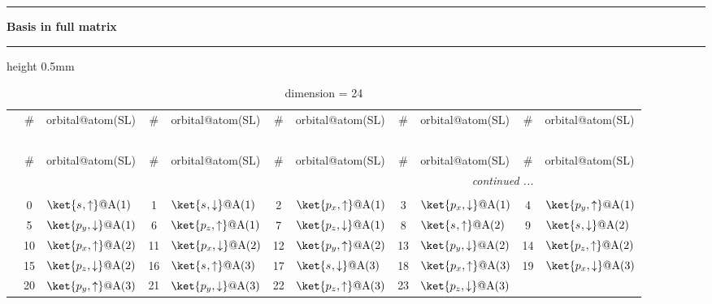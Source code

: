 \documentclass[fleqn,10pt,landscape]{jsarticle}
\begin{document}
\vspace{5mm}
\noindent \rule[0.5mm]{5mm}{0.5mm}\hspace{3mm}\textbf{Basis in full matrix}\hspace{3mm}\leaders\hrule height 0.5mm\hfill\kern0pt
\vspace{3mm}

\renewcommand{\arraystretch}{1.6}
\begin{longtable}[l]{c|cl|cl|cl|cl|cl}
\captionsetup{justification=raggedright, singlelinecheck=off}
\caption{dimension = 24}
 \\
 \hline \hline
 & \# & orbital@atom(SL) & \# & orbital@atom(SL) & \# & orbital@atom(SL) & \# & orbital@atom(SL) & \# & orbital@atom(SL) \\ \hline \endfirsthead

\multicolumn{10}{l}{\tablename\ \thetable{}} \\
 \hline \hline
 & \# & orbital@atom(SL) & \# & orbital@atom(SL) & \# & orbital@atom(SL) & \# & orbital@atom(SL) & \# & orbital@atom(SL) \\ \hline \endhead

 \hline \hline
\multicolumn{10}{r}{\footnotesize\it continued ...} \\ \endfoot

 \hline \hline
\multicolumn{10}{r}{} \\ \endlastfoot

 & 0 & $\ket{s_{},\uparrow}@{\rm A}(1)$ & 1 & $\ket{s_{},\downarrow}@{\rm A}(1)$ & 2 & $\ket{p_{x},\uparrow}@{\rm A}(1)$ & 3 & $\ket{p_{x},\downarrow}@{\rm A}(1)$ & 4 & $\ket{p_{y},\uparrow}@{\rm A}(1)$ \\
& 5 & $\ket{p_{y},\downarrow}@{\rm A}(1)$ & 6 & $\ket{p_{z},\uparrow}@{\rm A}(1)$ & 7 & $\ket{p_{z},\downarrow}@{\rm A}(1)$ & 8 & $\ket{s_{},\uparrow}@{\rm A}(2)$ & 9 & $\ket{s_{},\downarrow}@{\rm A}(2)$ \\
& 10 & $\ket{p_{x},\uparrow}@{\rm A}(2)$ & 11 & $\ket{p_{x},\downarrow}@{\rm A}(2)$ & 12 & $\ket{p_{y},\uparrow}@{\rm A}(2)$ & 13 & $\ket{p_{y},\downarrow}@{\rm A}(2)$ & 14 & $\ket{p_{z},\uparrow}@{\rm A}(2)$ \\
& 15 & $\ket{p_{z},\downarrow}@{\rm A}(2)$ & 16 & $\ket{s_{},\uparrow}@{\rm A}(3)$ & 17 & $\ket{s_{},\downarrow}@{\rm A}(3)$ & 18 & $\ket{p_{x},\uparrow}@{\rm A}(3)$ & 19 & $\ket{p_{x},\downarrow}@{\rm A}(3)$ \\
& 20 & $\ket{p_{y},\uparrow}@{\rm A}(3)$ & 21 & $\ket{p_{y},\downarrow}@{\rm A}(3)$ & 22 & $\ket{p_{z},\uparrow}@{\rm A}(3)$ & 23 & $\ket{p_{z},\downarrow}@{\rm A}(3)$ &  &  \\
\end{longtable}
\end{document}
